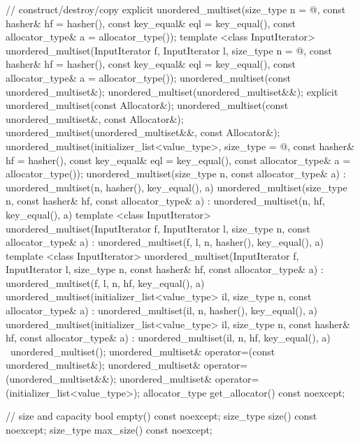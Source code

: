 \begin{codeblock}
{{    // construct/destroy/copy
    explicit unordered_multiset(size_type n = @\seebelow@,
                                const hasher& hf = hasher(),
                                const key_equal& eql = key_equal(),
                                const allocator_type& a = allocator_type());
    template <class InputIterator>
      unordered_multiset(InputIterator f, InputIterator l,
                         size_type n = @\seebelow@,
                         const hasher& hf = hasher(),
                         const key_equal& eql = key_equal(),
                         const allocator_type& a = allocator_type());
    unordered_multiset(const unordered_multiset&);
    unordered_multiset(unordered_multiset&&);
    explicit unordered_multiset(const Allocator&);
    unordered_multiset(const unordered_multiset&, const Allocator&);
    unordered_multiset(unordered_multiset&&, const Allocator&);
    unordered_multiset(initializer_list<value_type>,
      size_type = @\seebelow@,
      const hasher& hf = hasher(),
      const key_equal& eql = key_equal(),
      const allocator_type& a = allocator_type());
    unordered_multiset(size_type n, const allocator_type& a)
      : unordered_multiset(n, hasher(), key_equal(), a) { }
    unordered_multiset(size_type n, const hasher& hf, const allocator_type& a)
      : unordered_multiset(n, hf, key_equal(), a) { }
    template <class InputIterator>
      unordered_multiset(InputIterator f, InputIterator l, size_type n, const allocator_type& a)
      : unordered_multiset(f, l, n, hasher(), key_equal(), a) { }
    template <class InputIterator>
      unordered_multiset(InputIterator f, InputIterator l, size_type n, const hasher& hf, 
      const allocator_type& a)
      : unordered_multiset(f, l, n, hf, key_equal(), a) { }
    unordered_multiset(initializer_list<value_type> il, size_type n, const allocator_type& a)
      : unordered_multiset(il, n, hasher(), key_equal(), a) { }
    unordered_multiset(initializer_list<value_type> il, size_type n, const hasher& hf, 
    const allocator_type& a)
      : unordered_multiset(il, n, hf, key_equal(), a) { }
    ~unordered_multiset();
    unordered_multiset& operator=(const unordered_multiset&);
    unordered_multiset& operator=(unordered_multiset&&);
    unordered_multiset& operator=(initializer_list<value_type>);
    allocator_type get_allocator() const noexcept;

    // size and capacity
    bool empty() const noexcept;
    size_type size() const noexcept;
    size_type max_size() const noexcept;

}}
\end{codeblock}
